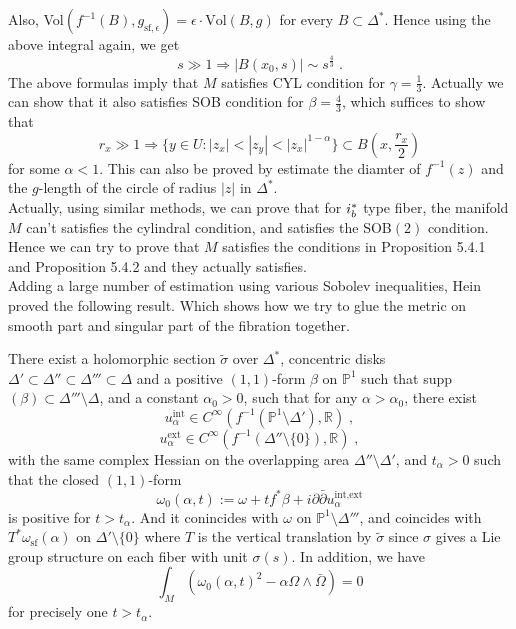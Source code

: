 \indent Also, Vol$(f^{-1}(B),g_{\textrm{sf},\epsilon})=\epsilon\cdot\textrm{Vol}(B,g)$ for every $B\subset \Delta^*$. Hence using the above integral again, we get
$$s\gg 1\Longrightarrow |B(x_0,s)|\sim s^{\frac{4}{3}}\; .$$
The above formulas imply that $M$ satisfies CYL condition for $\gamma=\frac{1}{3}$. Actually we can show that it also satisfies SOB condition for $\beta=\frac{4}{3}$, which suffices to show that
$$r_x\gg 1\Longrightarrow \{y\in U:|z_x|<|z_y|<|z_x|^{1-\alpha}\}\subset B(x,\frac{r_x}{2})$$
for some $\alpha<1$. This can also be proved by estimate the diamter of $f^{-1}(z)$ and the $g$-length of the circle of radius $|z|$ in $\Delta^*$.\\ \indent
Actually, using similar methods, we can prove that for $\uppercase\expandafter{\romannumeral1}_b^*$ type fiber, the manifold $M$ can't satisfies the cylindral condition, and satisfies the SOB$(2)$ condition. Hence we can try to prove that $M$ satisfies the conditions in Proposition 5.4.1 and Proposition 5.4.2 and they actually satisfies.\\ \indent
Adding a large number of estimation using various Sobolev inequalities, Hein proved\cite{hein2012gravitational} the following result. Which shows how we try to glue the metric on smooth part and singular part of the fibration together.
\begin{prop}
There exist a holomorphic section $\widetilde{\sigma}$ over $\Delta^*$, concentric disks $\Delta'\subset \Delta''\subset\Delta'''\subset\Delta$ and a positive $(1,1)$-form $\beta$ on $\mathbb{P}^1$ such that supp$(\beta)\subset \Delta'''\setminus\Delta$, and a constant $\alpha_0>0$, such that for any $\alpha>\alpha_0$, there exist $$u_\alpha^{\textrm{int}}\in C^\infty (f^{-1}(\mathbb{P}^1\setminus\Delta'),\mathbb{R})\; ,$$
$$u_\alpha^{\textrm{ext}}\in C^\infty (f^{-1}(\Delta''\setminus\{0\}),\mathbb{R})\; ,$$
with the same complex Hessian on the overlapping area $\Delta''\setminus\Delta'$, and $t_\alpha>0$ such that the closed $(1,1)$-form
$$\omega_0(\alpha,t):=\omega+tf^*\beta+i\partial\bar{\partial}u_{\alpha}^{\textrm{int,ext}} $$
is positive for $t>t_\alpha$. And it conincides with $\omega$ on $\mathbb{P}^1\setminus \Delta'''$, and coincides with $T^*\omega_{\textrm{sf}}(\alpha)$ on $\Delta'\setminus\{0\} $ where $T$ is the vertical translation by $\widetilde{\sigma}$ since $\sigma$ gives a Lie group structure on each fiber with unit $\sigma(s)$. In addition, we have 
$$\int_M\left(\omega_0(\alpha,t)^2-\alpha\Omega\wedge\bar{\Omega} \right)=0$$
for precisely one $t>t_\alpha$.
\end{prop}
